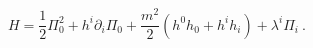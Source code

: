 \begin{equation}
H=\frac{1}{2}\Pi _{0}^{2}+h^{i}\partial _{i}\Pi _{0}+\frac{m^{2}}{2}\left(
h^{0}h_{0}+h^{i}h_{i}\right) +\lambda ^{i}\Pi _{i}\ .
\end{equation}%
